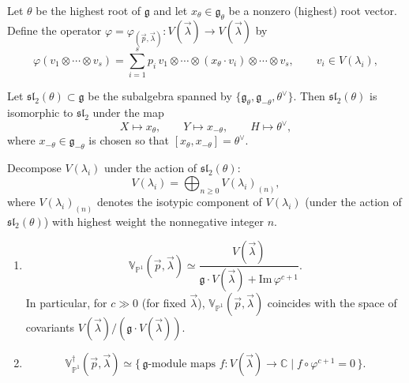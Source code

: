 \documentclass[12pt]{article}
\begin{document}
\begin{definition}
    Let $\theta$ be the highest root of $\mathfrak g$ and let $x_\theta \in \mathfrak g_\theta$ be a nonzero (highest) root vector.
    Define the operator $\varphi = \varphi_{(\vec{p},\vec{\lambda})} : V(\vec{\lambda}) \to V(\vec{\lambda})$ by
    \[
        \varphi(v_1 \otimes \cdots \otimes v_s)
        = \sum_{i=1}^s p_i\,v_1 \otimes \cdots \otimes (x_\theta \cdot v_i) \otimes \cdots \otimes v_s,
        \qquad v_i \in V(\lambda_i),
    \]
\end{definition}

Let $\mathfrak{sl}_2(\theta)\subset\mathfrak g$ be the subalgebra spanned by
$\{ \mathfrak g_\theta, \mathfrak g_{-\theta}, \theta^\vee \}$.
Then $\mathfrak{sl}_2(\theta)$ is isomorphic to $\mathfrak{sl}_2$ under the map
\[
    X \mapsto x_\theta,\qquad
    Y \mapsto x_{-\theta},\qquad
    H \mapsto \theta^\vee,
\]
where $x_{-\theta} \in \mathfrak g_{-\theta}$ is chosen so that $[x_\theta, x_{-\theta}] = \theta^\vee$.

Decompose $V(\lambda_i)$ under the action of $\mathfrak{sl}_2(\theta)$:
\[
    V(\lambda_i) = \bigoplus_{n \ge 0} V(\lambda_i)_{(n)},
\]
where $V(\lambda_i)_{(n)}$ denotes the isotypic component of $V(\lambda_i)$ (under the action of $\mathfrak{sl}_2(\theta)$)
with highest weight the nonnegative integer $n$.

\begin{theorem}\label{thm:vacua-on-p1}\leavevmode
    \begin{enumerate}
        \item[(a)]
              \[
                  \mathbb{V}_{\mathbb{P}^1}(\vec{p},\vec{\lambda})
                  \simeq
                  \frac{V(\vec{\lambda})}{\mathfrak g \cdot V(\vec{\lambda}) + \mathrm{Im}\,\varphi^{c+1}}.
              \]
              In particular, for $c \gg 0$ (for fixed $\vec{\lambda}$),
              $\mathbb{V}_{\mathbb{P}^1}(\vec{p},\vec{\lambda})$
              coincides with the space of covariants $V(\vec{\lambda})/(\mathfrak g \cdot V(\vec{\lambda}))$.
        \item[(b)]
              \[
                  \mathbb{V}_{\mathbb{P}^1}^\dagger(\vec{p},\vec{\lambda})
                  \simeq
                  \{\, \mathfrak g\text{-module maps } f: V(\vec{\lambda}) \to \mathbb{C}
                  \mid f\circ\varphi^{c+1}=0 \,\}.
              \]
    \end{enumerate}
\end{theorem}
\end{document}
